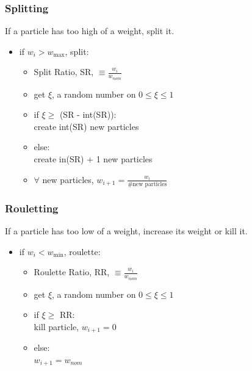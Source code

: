 \documentclass[xcolor=x11names,compress]{beamer}
\renewcommand{\(}{\begin{columns}}
\renewcommand{\)}{\end{columns}}
\newcommand{\<}[1]{\begin{column}{#1}}
\renewcommand{\>}{\end{column}}
\begin{document}
\begin{frame}[fragile]
  \frametitle{Splitting}
  
  If a particle has too high of a weight, split it.
  \vspace*{1 em}
  
  \begin{itemize}
  	\item if $w_i > w_{\max}$, split:
  	\begin{itemize}
  	    	\item Split Ratio, SR, $\equiv \frac{w_i}{w_{nom}}$
  	\item get $\xi$, a random number on $0 \leq \xi \leq 1$
  	\item if $\xi \geq$ (SR - int(SR)):\\
  	      \hspace*{2 em} create int(SR) new particles 
  	\item else:\\
  	      \hspace*{2 em}create in(SR) + 1 new particles
  	\item $\forall$ new particles, $w_{i+1} = \frac{w_i}{\text{\# new particles}}$
  	\end{itemize}
  \end{itemize}

\end{frame}


\begin{frame}[fragile]
  \frametitle{Rouletting}
  
  If a particle has too low of a weight, increase its weight or kill it.
  \vspace*{1 em}
  
  \begin{itemize}
  	\item if $w_i < w_{\min}$, roulette:
  	\begin{itemize}
  	    	\item Roulette Ratio, RR, $\equiv \frac{w_i}{w_{nom}}$
  	\item get $\xi$, a random number on $0 \leq \xi \leq 1$
  	\item if $\xi \geq$ RR:\\
  	      \hspace*{2 em} kill particle, $w_{i+1} = 0$ 
  	\item else:\\
  	      \hspace*{2 em} $w_{i+1} = w_{nom}$
  	\end{itemize}
  \end{itemize}

\end{frame}
\end{document}
